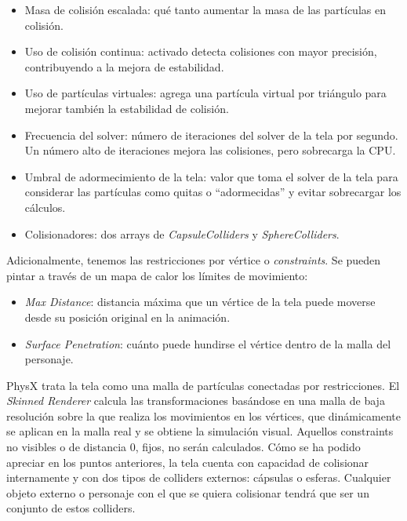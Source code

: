 \begin{itemize}
  \item Masa de colisión escalada: qué tanto aumentar la masa de las partículas en colisión.
  \item Uso de colisión continua: activado detecta colisiones con mayor precisión, contribuyendo a la mejora de estabilidad. 
  \item Uso de partículas virtuales: agrega una partícula virtual por triángulo para mejorar también la estabilidad de colisión.
  \item Frecuencia del solver: número de iteraciones del solver de la tela por segundo. Un número alto de iteraciones mejora las colisiones, pero sobrecarga la CPU.
  \item Umbral de adormecimiento de la tela: valor que toma el solver de la tela para considerar las partículas como quitas o ``adormecidas'' y evitar sobrecargar los cálculos.
  \item Colisionadores: dos arrays de \textit{CapsuleColliders} y \textit{SphereColliders}.
\end{itemize}

Adicionalmente, tenemos las restricciones por vértice o \textit{constraints}. Se pueden pintar a través de un mapa de calor los límites de movimiento:
\begin{itemize}
  \item \textit{Max Distance}: distancia máxima que un vértice de la tela puede moverse desde su posición original en la animación.
  \item \textit{Surface Penetration}: cuánto puede hundirse el vértice dentro de la malla del personaje.
\end{itemize}

PhysX trata la tela como una malla de partículas conectadas por restricciones. El \textit{Skinned Renderer} calcula las transformaciones basándose en una malla de baja resolución sobre la que realiza los movimientos en los vértices, que dinámicamente se aplican en la malla real y se obtiene la simulación visual. Aquellos constraints no visibles o de distancia 0, fijos, no serán calculados. Cómo se ha podido apreciar en los puntos anteriores, la tela cuenta con capacidad de colisionar internamente y con dos tipos de colliders externos: cápsulas o esferas. Cualquier objeto externo o personaje con el que se quiera colisionar tendrá que ser un conjunto de estos colliders. \newline

